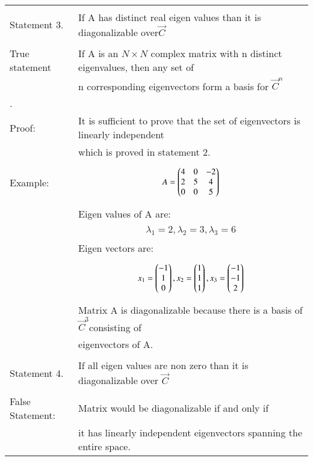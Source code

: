 \documentclass[journal,12pt,twocolumn]{IEEEtran}
\begin{document}
\begin{table*}[!t]
    \centering
    \begin{tabular}{|l|l|}
    \hline
& \\
Statement 3.  & If A has distinct real  eigen values
 than  it is diagonalizable over$\vec{C}$\\
\hline
&\\
True statement& If A is an $N \times N$ complex matrix with n distinct eigenvalues, then any set of\\
& n corresponding eigenvectors form a basis for $\vec{C}^n$\\ .
&\\
Proof: &It is sufficient to prove that the set of eigenvectors is linearly independent \\
&which is proved in statement 2.\\
 Example:&\parbox{12cm}{\begin{align}A=\begin{pmatrix}
4& 0 &-2\\
2& 5 &4\\
0& 0 &5
\end{pmatrix}\end{align}}\\
& Eigen values of A are:\\
& \parbox{12cm}{\begin{align}\lambda_1=2,\lambda_2=3 , \lambda_3=6\end{align}}\\
& Eigen vectors are:\\&\parbox{12cm}{\begin{align}x_1=\begin{pmatrix}
-1\\1\\0
\end{pmatrix},
x_ 2=\begin{pmatrix}
1\\1\\1
\end{pmatrix},
x_3=\begin{pmatrix}
-1\\ - 1\\ 2
\end{pmatrix}\end{align}}
\\
 & Matrix A is diagonalizable because there is a basis of $\vec{C}^3 $consisting of\\
& eigenvectors of A.\\
\hline
& \\
Statement 4. & If all eigen values are non zero than it is diagonalizable over $\vec{C}$\\
\hline
& \\
False Statement:& Matrix would be diagonalizable if and only if\\ &it has linearly independent eigenvectors spanning the entire space.\\

\end{tabular}
\end{table*}
\end{document}
